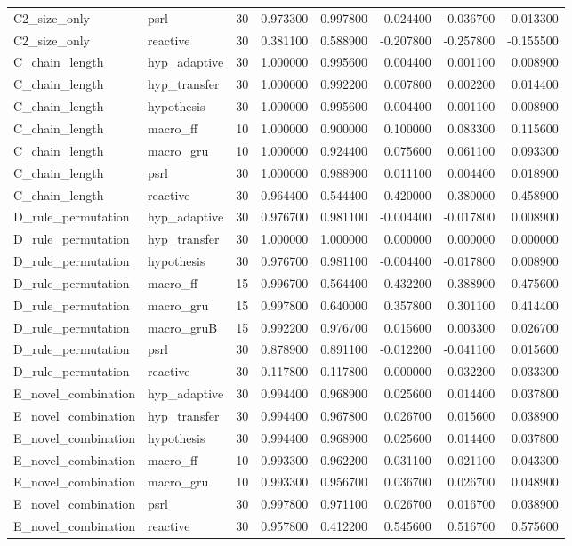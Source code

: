 \begin{tabular}{llrrrrrr}
C2\_size\_only & psrl & 30 & 0.973300 & 0.997800 & -0.024400 & -0.036700 & -0.013300 \\
C2\_size\_only & reactive & 30 & 0.381100 & 0.588900 & -0.207800 & -0.257800 & -0.155500 \\
C\_chain\_length & hyp\_adaptive & 30 & 1.000000 & 0.995600 & 0.004400 & 0.001100 & 0.008900 \\
C\_chain\_length & hyp\_transfer & 30 & 1.000000 & 0.992200 & 0.007800 & 0.002200 & 0.014400 \\
C\_chain\_length & hypothesis & 30 & 1.000000 & 0.995600 & 0.004400 & 0.001100 & 0.008900 \\
C\_chain\_length & macro\_ff & 10 & 1.000000 & 0.900000 & 0.100000 & 0.083300 & 0.115600 \\
C\_chain\_length & macro\_gru & 10 & 1.000000 & 0.924400 & 0.075600 & 0.061100 & 0.093300 \\
C\_chain\_length & psrl & 30 & 1.000000 & 0.988900 & 0.011100 & 0.004400 & 0.018900 \\
C\_chain\_length & reactive & 30 & 0.964400 & 0.544400 & 0.420000 & 0.380000 & 0.458900 \\
D\_rule\_permutation & hyp\_adaptive & 30 & 0.976700 & 0.981100 & -0.004400 & -0.017800 & 0.008900 \\
D\_rule\_permutation & hyp\_transfer & 30 & 1.000000 & 1.000000 & 0.000000 & 0.000000 & 0.000000 \\
D\_rule\_permutation & hypothesis & 30 & 0.976700 & 0.981100 & -0.004400 & -0.017800 & 0.008900 \\
D\_rule\_permutation & macro\_ff & 15 & 0.996700 & 0.564400 & 0.432200 & 0.388900 & 0.475600 \\
D\_rule\_permutation & macro\_gru & 15 & 0.997800 & 0.640000 & 0.357800 & 0.301100 & 0.414400 \\
D\_rule\_permutation & macro\_gruB & 15 & 0.992200 & 0.976700 & 0.015600 & 0.003300 & 0.026700 \\
D\_rule\_permutation & psrl & 30 & 0.878900 & 0.891100 & -0.012200 & -0.041100 & 0.015600 \\
D\_rule\_permutation & reactive & 30 & 0.117800 & 0.117800 & 0.000000 & -0.032200 & 0.033300 \\
E\_novel\_combination & hyp\_adaptive & 30 & 0.994400 & 0.968900 & 0.025600 & 0.014400 & 0.037800 \\
E\_novel\_combination & hyp\_transfer & 30 & 0.994400 & 0.967800 & 0.026700 & 0.015600 & 0.038900 \\
E\_novel\_combination & hypothesis & 30 & 0.994400 & 0.968900 & 0.025600 & 0.014400 & 0.037800 \\
E\_novel\_combination & macro\_ff & 10 & 0.993300 & 0.962200 & 0.031100 & 0.021100 & 0.043300 \\
E\_novel\_combination & macro\_gru & 10 & 0.993300 & 0.956700 & 0.036700 & 0.026700 & 0.048900 \\
E\_novel\_combination & psrl & 30 & 0.997800 & 0.971100 & 0.026700 & 0.016700 & 0.038900 \\
E\_novel\_combination & reactive & 30 & 0.957800 & 0.412200 & 0.545600 & 0.516700 & 0.575600 \\
\bottomrule
\end{tabular}
